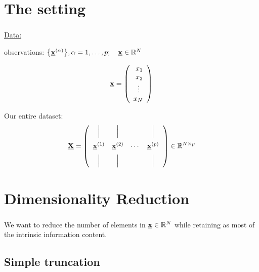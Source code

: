 \section{The setting}

\begin{frame}\frametitle{\secname}
    
\underline{Data:}

observations: $\big\{ \underline{\mathbf{x}}^{(\alpha)} \big\}, \alpha = 1, \ldots, p; \quad \underline{\mathbf{x}} \in \mathbb{R}^N$

$$
\underline{\mathbf{x}} = \left( \begin{array}{rrrrrrrrrrrrrrrrrrrrrrrrrr} 
x_1\\
x_2\\
\vdots\;\,\\
x_N
\\ \end{array} \right)
$$

Our entire dataset:
\[
\underline{\mathbf{X}} = 
\left(
\begin{array}{cccc}
\Big| & \Big| & &\Big| \\[3mm]
\underline{\mathbf{x}}^{(1)} & \underline{\mathbf{x}}^{(2)} & \cdots &\underline{\mathbf{x}}^{(p)}\\[2mm]
\Big| & \Big| & &\Big|
\end{array}
\right) \in \mathbb{R}^{N \times p}
\]

\end{frame}

\section{Dimensionality Reduction}

\begin{frame}\frametitle{\secname}
We want to reduce the number of elements in $\underline{\mathbf{x}} \in \mathbb{R}^N$
while retaining as most of the intrinsic information content.



\end{frame}

\subsection{Simple truncation}




